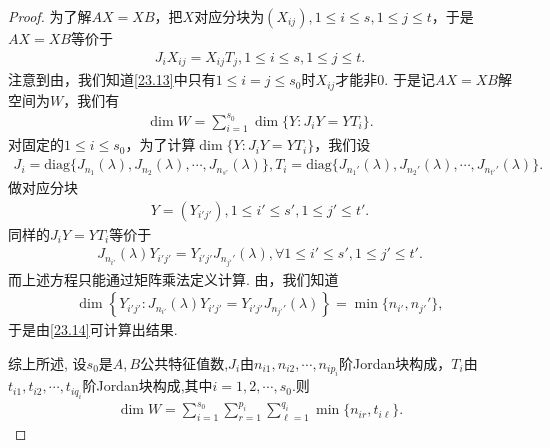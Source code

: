 \documentclass[../../main.tex]{subfiles}
\begin{document}
\begin{proof}
为了解$AX = XB$，把$X$对应分块为$(X_{ij}), 1\leqslant i\leqslant s, 1\leqslant j\leqslant t$，于是$AX = XB$等价于
\begin{align}
J_iX_{ij} = X_{ij}T_j, 1\leqslant i\leqslant s, 1\leqslant j\leqslant t. \label{23.13}
\end{align}
注意到由，我们知道\eqref{23.13}中只有$1\leqslant i = j\leqslant s_0$时$X_{ij}$才能非$0$. 于是记$AX = XB$解空间为$W$，我们有
\begin{align}
\dim W = \sum_{i = 1}^{s_0}\dim\{Y : J_iY = YT_i\}. \label{23.14}
\end{align}
对固定的$1\leqslant i\leqslant s_0$，为了计算$\dim\{Y : J_iY = YT_i\}$，我们设
\begin{align*}
J_i = \mathrm{diag}\{J_{n_1}(\lambda), J_{n_2}(\lambda), \cdots, J_{n_{s'}}(\lambda)\}, T_i = \mathrm{diag}\{J_{n_1'}(\lambda), J_{n_2'}(\lambda), \cdots, J_{n_{t'}'}(\lambda)\}.
\end{align*}
做对应分块
\begin{align*}
Y = (Y_{i'j'}), 1\leqslant i'\leqslant s', 1\leqslant j'\leqslant t'.
\end{align*}
同样的$J_iY = YT_i$等价于
\begin{align}
J_{n_{i'}}(\lambda)Y_{i'j'} = Y_{i'j'}J_{n_{j'}'}(\lambda), \forall 1\leqslant i'\leqslant s', 1\leqslant j'\leqslant t'. \label{23.15}
\end{align}
而上述方程只能通过矩阵乘法定义计算. 由，我们知道
\begin{align*}
\dim\left\{Y_{i'j'} : J_{n_{i'}}(\lambda)Y_{i'j'} = Y_{i'j'}J_{n_{j'}'}(\lambda)\right\} = \min\{n_{i'}, n_{j'}'\},
\end{align*}
于是由\eqref{23.14}可计算出结果. 

综上所述,
设$s_0$是$A, B$公共特征值数,$J_i$由$n_{i1}, n_{i2}, \cdots, n_{ip_i}$阶Jordan块构成，$T_i$由$t_{i1}, t_{i2}, \cdots, t_{iq_i}$阶Jordan块构成,其中$i=1,2,\cdots,s_0$.则
\begin{align}
\dim W = \sum_{i = 1}^{s_0}\sum_{r = 1}^{p_i}\sum_{\ell = 1}^{q_i}\min\{n_{ir}, t_{i\ell}\}. \label{23.16}
\end{align}
\end{proof}
\end{document}
